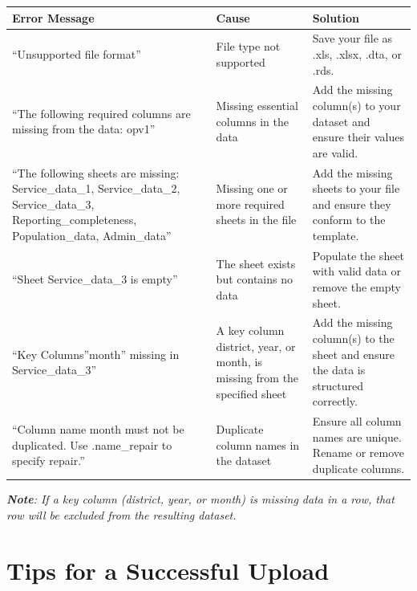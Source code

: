 \documentclass[
  english,
  letterpaper,
  DIV=11,
  numbers=noendperiod]{scrreprt}
\begin{document}
\begin{longtable}[]{@{}
  >{\raggedright\arraybackslash}p{}
  >{\raggedright\arraybackslash}p{}
  >{\raggedright\arraybackslash}p{}@{}}
\toprule\noalign{}
\begin{minipage}[b]{\linewidth}\raggedright
\textbf{Error Message}
\end{minipage} & \begin{minipage}[b]{\linewidth}\raggedright
\textbf{Cause}
\end{minipage} & \begin{minipage}[b]{\linewidth}\raggedright
\textbf{Solution}
\end{minipage} \\
\midrule\noalign{}
\endhead
\bottomrule\noalign{}
\endlastfoot
``Unsupported file format'' & File type not supported & Save your file
as .xls, .xlsx, .dta, or .rds. \\
``The following required columns are missing from the data: opv1'' &
Missing essential columns in the data & Add the missing column(s) to
your dataset and ensure their values are valid. \\
``The following sheets are missing: Service\_data\_1, Service\_data\_2,
Service\_data\_3, Reporting\_completeness, Population\_data,
Admin\_data'' & Missing one or more required sheets in the file & Add
the missing sheets to your file and ensure they conform to the
template. \\
``Sheet Service\_data\_3 is empty'' & The sheet exists but contains no
data & Populate the sheet with valid data or remove the empty sheet. \\
``Key Columns''month'' missing in Service\_data\_3'' & A key column
district, year, or month, is missing from the specified sheet & Add the
missing column(s) to the sheet and ensure the data is structured
correctly. \\
``Column name month must not be duplicated. Use .name\_repair to specify
repair.'' & Duplicate column names in the dataset & Ensure all column
names are unique. Rename or remove duplicate columns. \\
\end{longtable}

\emph{\textbf{Note}: If a key column (district, year, or month) is
missing data in a row, that row will be excluded from the resulting
dataset.}

\section{\texorpdfstring{\textbf{Tips for a Successful
Upload}}{Tips for a Successful Upload}}\label{tips-for-a-successful-upload}
\end{document}
